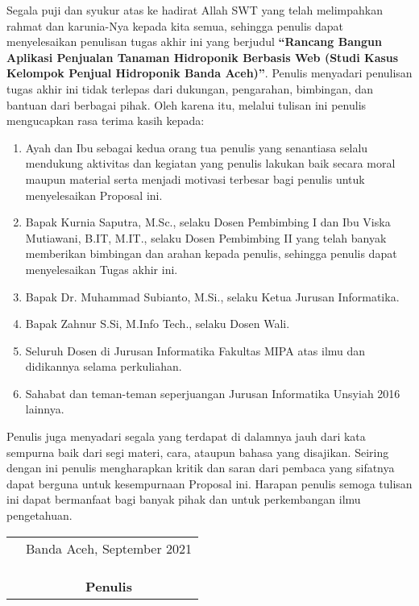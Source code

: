 \preface %


Segala puji dan syukur atas ke hadirat Allah SWT yang telah melimpahkan rahmat dan karunia-Nya kepada kita semua, sehingga penulis dapat menyelesaikan penulisan tugas akhir ini yang berjudul \textbf{“Rancang Bangun Aplikasi Penjualan Tanaman Hidroponik Berbasis Web (Studi Kasus Kelompok Penjual Hidroponik Banda Aceh)”}. Penulis menyadari penulisan tugas akhir ini tidak terlepas dari dukungan, pengarahan, bimbingan, dan bantuan dari berbagai pihak. Oleh karena itu, melalui tulisan ini penulis mengucapkan rasa terima kasih kepada:

\begin{enumerate}
	\item{Ayah dan Ibu sebagai kedua orang tua penulis yang senantiasa selalu mendukung aktivitas dan kegiatan yang penulis lakukan baik secara moral maupun material serta menjadi motivasi terbesar bagi penulis untuk menyelesaikan Proposal ini.}
	\item{Bapak Kurnia Saputra, M.Sc., selaku Dosen Pembimbing I dan Ibu Viska Mutiawani, B.IT, M.IT., selaku Dosen Pembimbing II yang telah banyak memberikan bimbingan dan arahan kepada penulis, sehingga penulis dapat menyelesaikan Tugas akhir ini.}
	\item {Bapak Dr. Muhammad Subianto, M.Si., selaku Ketua Jurusan Informatika.}
	\item{Bapak Zahnur S.Si, M.Info Tech., selaku Dosen Wali.}
	\item{Seluruh Dosen di Jurusan Informatika Fakultas MIPA atas ilmu dan didikannya selama perkuliahan.}
	\item{Sahabat dan teman-teman seperjuangan Jurusan Informatika Unsyiah 2016 lainnya.}
\end{enumerate}


Penulis juga menyadari segala yang terdapat di dalamnya jauh dari kata sempurna baik dari segi materi, cara, ataupun bahasa yang disajikan. Seiring dengan ini penulis mengharapkan kritik dan saran dari pembaca yang sifatnya dapat berguna untuk kesempurnaan Proposal ini. Harapan penulis semoga tulisan ini dapat bermanfaat bagi banyak pihak dan untuk perkembangan ilmu pengetahuan.

\vspace{1cm}


\begin{tabular}{p{7.5cm}c}
	&Banda Aceh, September 2021\\
	&\\
	&\\
	&\\
	&\textbf{Penulis}
\end{tabular}